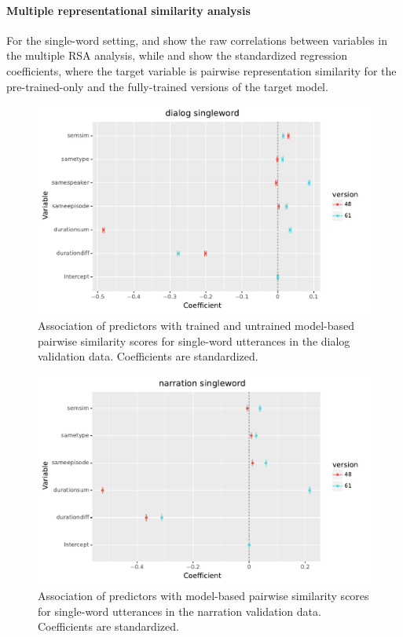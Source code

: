  
\paragraph{Multiple representational similarity analysis}

For the single-word setting, 
 and  show the raw
correlations between variables in the multiple RSA analysis, while
 and  show the
standardized regression coefficients, where the target variable is
pairwise representation similarity for the pre-trained-only and the
fully-trained versions of the target model.



\begin{figure}
  \centering
  \includegraphics[scale=0.66]{results/grsa_dialog_word_coef.pdf}
  \caption{Association of predictors with trained and untrained
    model-based pairwise similarity scores for single-word utterances
    in the dialog validation data. Coefficients are standardized.}
  \label{fig:coef_word_dialog}
\end{figure}

\begin{figure}
  \centering
  \includegraphics[scale=0.66]{results/grsa_narration_word_coef.pdf}
  \caption{Association of predictors with 
    model-based pairwise similarity scores for single-word utterances
    in the narration validation data. Coefficients are standardized.}
  \label{fig:coef_word_narration}
\end{figure}


